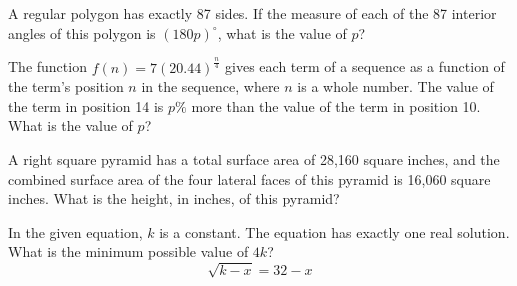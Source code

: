 \noindent\markforreview
\vspace{1em}

A regular polygon has exactly 87 sides.
If the measure of each of the 87 interior angles of this polygon is \((180p)^\circ\), what is the value of \(p\)?

\vspace{0.75em}


\vspace{2em}
\newpage

\noindent\markforreview
\vspace{1em}

The function \(f(n) = 7(20.44)^{\frac{n}{4}}\) gives each term of a sequence as a function of the term's position \(n\) in the sequence, where \(n\) is a whole number.
The value of the term in position 14 is \(p\%\) more than the value of the term in position 10.
What is the value of \(p\)?

\vspace{2em}
\newpage

\noindent\markforreview
\vspace{1em}

A right square pyramid has a total surface area of 28,160 square inches, and the combined surface area of the four lateral faces of this pyramid is 16,060 square inches.
What is the height, in inches, of this pyramid?

\vspace{0.75em}


\vspace{2em}
\newpage

\noindent\markforreview
\vspace{1em}

In the given equation, \(k\) is a constant.
The equation has exactly one real solution.
What is the minimum possible value of \(4k\)?
\[
\sqrt{k - x} = 32 - x
\]

\vspace{2em}
